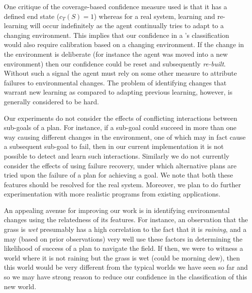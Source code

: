 %

One critique of the coverage-based confidence measure used is that it has a defined end state ($c_T(S)=1$) whereas for a real system, learning and re-learning will occur indefinitely as the agent continually tries to adapt to a changing environment. This implies that our confidence in a \dt's classification would also require calibration based on a changing environment. If the change in the environment is deliberate (for instance the agent was moved into a new environment) then our confidence could be reset and subsequently \textit{re-built}. Without such a signal the agent must rely on some other measure to attribute failures to environmental changes. The problem of identifying changes that warrant new learning as compared to adapting previous learning, however, is generally considered to be hard.

Our experiments do not consider the effects of conflicting interactions between sub-goals of a plan. For instance, if a sub-goal could succeed in more than one way causing different changes in the environment, one of which may in fact cause a subsequent sub-goal to fail, then in our current implementation it is not possible to detect and learn such interactions. Similarly we do not currently consider the effects of using failure recovery, under which alternative plans are tried upon the failure of a plan for achieving a goal. We note that both these features should be resolved for the real system. Moreover, we plan to do further experimentation with more realistic programs from existing applications. 

An appealing avenue for improving our work is in identifying environmental changes using the relatedness of its features. For instance, an observation that the grass is \textit{wet} presumably has a high correlation to the fact that it is \textit{raining}, and a \dt may (based on prior observations) very well use these factors in determining the likelihood of success of a plan to navigate the field. If then, we were to witness a world where it is not raining but the grass is wet (could be morning dew), then this world would be very different from the typical worlds we have seen so far and so we may have strong reason to reduce our confidence in the \dt classification of this new world.



